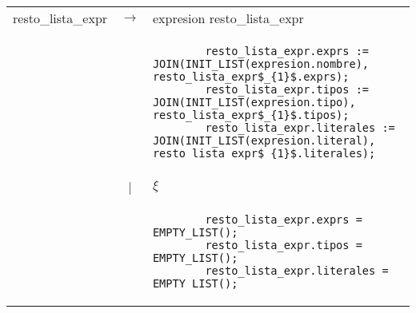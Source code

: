 \begin{tabular}{r c p{}}
			resto\_lista\_expr	& $\longrightarrow$ 	& \ter{,} expresion resto\_lista\_expr \\
								&					& \begin{lstlisting}
        resto_lista_expr.exprs := JOIN(INIT_LIST(expresion.nombre), resto_lista_expr$_{1}$.exprs);
        resto_lista_expr.tipos := JOIN(INIT_LIST(expresion.tipo), resto_lista_expr$_{1}$.tipos);
        resto_lista_expr.literales := JOIN(INIT_LIST(expresion.literal), resto_lista_expr$_{1}$.literales);
                    									\end{lstlisting} \\
									
								& | 					& $\xi$ \\
								&					& \begin{lstlisting}
        resto_lista_expr.exprs = EMPTY_LIST();
        resto_lista_expr.tipos = EMPTY_LIST();
        resto_lista_expr.literales = EMPTY_LIST();
                    									\end{lstlisting} \\
        
        
\end{tabular}


